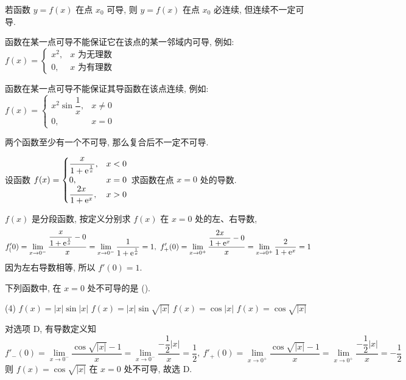 \begin{theorem}[函数的可导性与连续性]
    若函数 $y=f(x)$ 在点 $x_0$ 可导, 则 $y=f(x)$ 在点 $x_0$ 必连续, 但连续不一定可导.

    函数在某一点可导不能保证它在该点的某一邻域内可导, 例如: $f(x)=\begin{cases}
            x^2, & x\text{ 为无理数} \\
            0,   & x\text{ 为有理数}
        \end{cases}$

    函数在某一点可导不能保证其导函数在该点连续, 例如: $f(x)=\begin{cases}
            x^2\sin\dfrac{1}{x}, & x\neq0 \\
            0,                   & x=0
        \end{cases}$

    两个函数至少有一个不可导, 那么复合后不一定不可导.
\end{theorem}

\begin{example}
    设函数 $f(x)=\begin{cases}
            \dfrac{x}{1+\mathrm{e} ^{\frac{1}{x}}}, & x<0 \\0,&x=0\\ \dfrac{2x}{1+\mathrm{e}^x},&x>0
        \end{cases}$ 求函数在点 $x=0$ 处的导数.
\end{example}
\begin{solution}
    $f(x)$ 是分段函数, 按定义分别求 $f(x)$ 在 $x=0$ 处的左、右导数,
    $$f'_(0)=\lim_{x\to0^-}\dfrac{\dfrac{x}{1+\mathrm{e} ^{\frac{1}{x}}}-0}{x}=\lim_{x\to0 ^-}\dfrac{1}{1+\mathrm{e} ^{\frac{1}{x}}}=1,~f'_+(0)=\lim_{x\to0^+}\dfrac{\dfrac{2x}{1+\mathrm{e}^x}-0}{x}=\lim_{x\to0^+}\dfrac{2}{1+\mathrm{e}^x}=1$$
    因为左右导数相等, 所以 $f'(0)=1$.
\end{solution}

\begin{example}[2018 数一]
    下列函数中, 在 $x=0$ 处不可导的是 (\quad).
    \begin{tasks}(4)
        \task $f(x)=|x|\sin |x|$
        \task $f(x)=|x|\sin \sqrt{|x|}$
        \task $f(x)=\cos |x|$
        \task $f(x)=\cos \sqrt{|x|}$
    \end{tasks}
\end{example}
\begin{solution}
    对选项 D, 有导数定义知
    $$f'_-(0)=\lim_{x\to0^-}\dfrac{\cos\sqrt{|x|}-1}{x}=\lim_{x\to0^-}\dfrac{-\dfrac{1}{2}|x|}{x}=\dfrac{1}{2},~f'_+(0)=\lim_{x\to0^+}\dfrac{\cos\sqrt{|x|}-1}{x}=\lim_{x\to0^+}\dfrac{-\dfrac{1}{2}|x|}{x}=-\dfrac{1}{2}$$
    则 $f(x)=\cos \sqrt{|x|}$ 在 $x=0$ 处不可导, 故选 D.
\end{solution}



